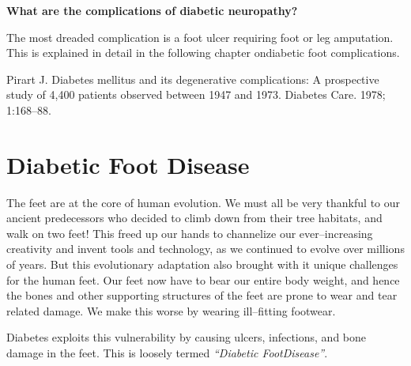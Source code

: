 \noindent\textbf{What are the complications of diabetic neuropathy?}

The most dreaded complication is a foot ulcer requiring foot or leg amputation. This is explained in detail in the following chapter on\break diabetic foot complications.

\begin{thebibliography}{99}
 Pirart J. Diabetes mellitus and its degenerative complications: A prospective study of 4,400 patients observed between 1947 and 1973. Diabetes Care. 1978; 1:168–88.
\end{thebibliography}


\chapter{Diabetic Foot Disease}\label{chap17}

The feet are at the core of human evolution. We must all be very thankful to our ancient predecessors who decided to climb down from their tree habitats, and walk on two feet! This freed up our hands to channe\-lize our ever–increasing creativity and invent tools and technology, as we continued to evolve over millions of years. But this evolutionary adaptation also brought with it unique challenges for the human feet. Our feet now have to bear our entire body weight, and hence the bones and other supporting structures of the feet are prone to wear and tear related damage. We make this worse by wearing ill–fitting footwear.

Diabetes exploits this vulnerability by causing ulcers, infections, and bone damage in the feet. This is loosely termed \textit{“Diabetic Foot\break Disease”}.

